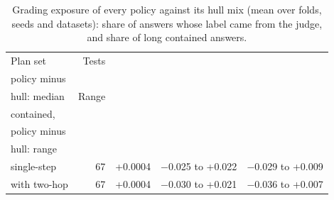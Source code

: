 \begin{table}[t]
\centering\small
\setlength{\tabcolsep}{4pt}
\caption{Grading exposure of every policy against its hull mix (mean over folds, seeds and datasets): share of answers whose label came from the judge, and share of long contained answers.}
\label{tab:extra_exposure}
\begin{tabular*}{\linewidth}{@{\extracolsep{\fill}}lrrrr}
\toprule
Plan set & Tests & \begin{tabular}[b]{@{}r@{}}Judge share, \\ policy minus \\ hull: median\end{tabular} & Range & \begin{tabular}[b]{@{}r@{}}Long \\ contained, \\ policy minus \\ hull: range\end{tabular} \\
\midrule
single-step & 67 & +0.0004 & $-$0.025 to +0.022 & $-$0.029 to +0.009 \\
with two-hop & 67 & +0.0004 & $-$0.030 to +0.021 & $-$0.036 to +0.007 \\
\bottomrule
\end{tabular*}
\end{table}
